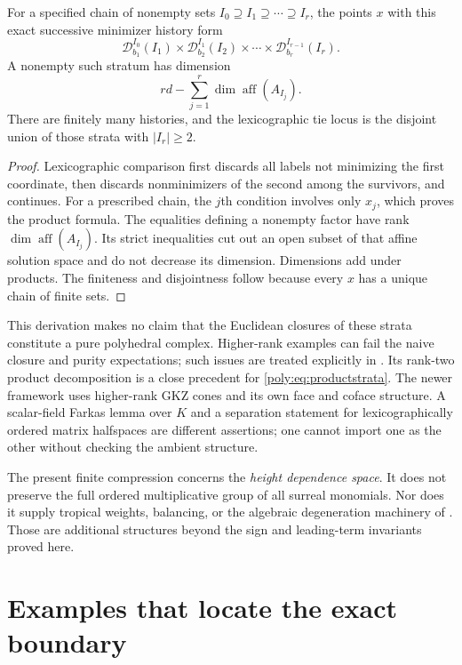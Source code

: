 \documentclass[11pt,a4paper]{article}
\numberwithin{equation}{section}
\theoremstyle{plain}
\newcommand{\aff}{\operatorname{aff}}
\newcommand{\cD}{\mathcal D}
\begin{document}
\begin{proposition}
\label{poly:prop:tropstrata}
For a specified chain of nonempty sets
$I_0\supseteq I_1\supseteq\cdots\supseteq I_r$, the points $x$ with
this exact successive minimizer history form
\begin{equation}\label{poly:eq:productstrata}
 \cD_{b_1}^{I_0}(I_1)\times
 \cD_{b_2}^{I_1}(I_2)\times\cdots\times
 \cD_{b_r}^{I_{r-1}}(I_r).
\end{equation}
A nonempty such stratum has dimension
\[
 rd-\sum_{j=1}^r\dim\aff(A_{I_j}).
\]
There are finitely many histories, and the lexicographic tie locus is the
disjoint union of those strata with $|I_r|\ge2$.
\end{proposition}
\begin{proof}
Lexicographic comparison first discards all labels not minimizing the first
coordinate, then discards nonminimizers of the second among the survivors,
and continues. For a prescribed chain, the $j$th condition involves only
$x_j$, which proves the product formula. The equalities defining a
nonempty factor have rank $\dim\aff(A_{I_j})$. Its strict inequalities
cut out an open subset of that affine solution space and do not decrease
its dimension. Dimensions add under products. The finiteness and disjointness
follow because every $x$ has a unique chain of finite sets.
\end{proof}

This derivation makes no claim that the Euclidean closures of these strata
constitute a pure polyhedral complex. Higher-rank examples can fail the
naive closure and purity expectations; such issues are treated explicitly
in \cite{fs:JS}. Its rank-two product decomposition is a close precedent for
\eqref{poly:eq:productstrata}. The newer framework \cite{fs:CCFL} uses higher-rank
GKZ cones and its own face and coface structure. A scalar-field Farkas
lemma over $K$ and a separation statement for lexicographically ordered
matrix halfspaces are different assertions; one cannot import one as the
other without checking the ambient structure.

The present finite compression concerns the \emph{height dependence
space}. It does not preserve the full ordered multiplicative group of all
surreal monomials. Nor does it supply tropical weights, balancing, or the
algebraic degeneration machinery of \cite{fs:CCFL}. Those are additional
structures beyond the sign and leading-term invariants proved here.

\section{Examples that locate the exact boundary}
\label{poly:sec:examples}
\end{document}

